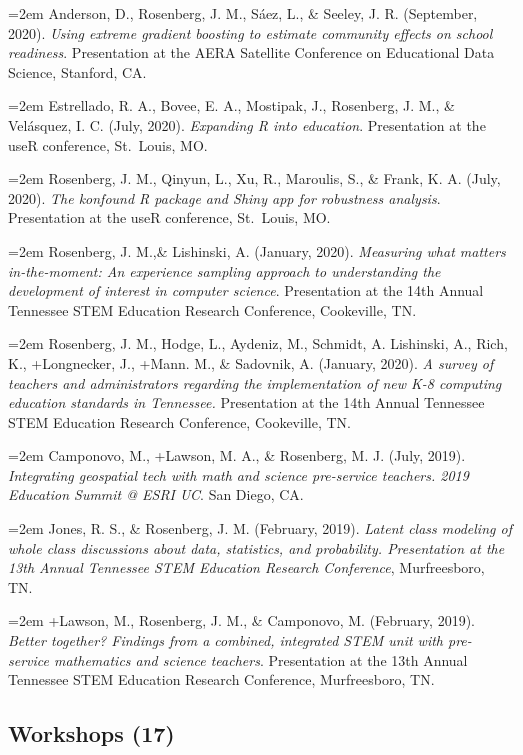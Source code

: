 \documentclass[
  14,
]{article}
\begin{document}
\hangindent=2em Anderson, D., Rosenberg, J. M., Sáez, L., \& Seeley, J.
R. (September, 2020). \emph{Using extreme gradient boosting to estimate
community effects on school readiness}. Presentation at the AERA
Satellite Conference on Educational Data Science, Stanford, CA.

\hangindent=2em Estrellado, R. A., Bovee, E. A., Mostipak, J.,
Rosenberg, J. M., \& Velásquez, I. C. (July, 2020). \emph{Expanding R
into education}. Presentation at the useR conference, St.~Louis, MO.

\hangindent=2em Rosenberg, J. M., Qinyun, L., Xu, R., Maroulis, S., \&
Frank, K. A. (July, 2020). \emph{The konfound R package and Shiny app
for robustness analysis}. Presentation at the useR conference,
St.~Louis, MO.

\hangindent=2em Rosenberg, J. M.,\& Lishinski, A. (January, 2020).
\emph{Measuring what matters in-the-moment: An experience sampling
approach to understanding the development of interest in computer
science}. Presentation at the 14th Annual Tennessee STEM Education
Research Conference, Cookeville, TN.

\hangindent=2em Rosenberg, J. M., Hodge, L., Aydeniz, M., Schmidt, A.
Lishinski, A., Rich, K., +Longnecker, J., +Mann. M., \& Sadovnik, A.
(January, 2020). \emph{A survey of teachers and administrators regarding
the implementation of new K-8 computing education standards in
Tennessee.} Presentation at the 14th Annual Tennessee STEM Education
Research Conference, Cookeville, TN.

\hangindent=2em Camponovo, M., +Lawson, M. A., \& Rosenberg, M. J.
(July, 2019). \emph{Integrating geospatial tech with math and science
pre-service teachers. 2019 Education Summit @ ESRI UC}. San Diego, CA.

\hangindent=2em Jones, R. S., \& Rosenberg, J. M. (February, 2019).
\emph{Latent class modeling of whole class discussions about data,
statistics, and probability. Presentation at the 13th Annual Tennessee
STEM Education Research Conference}, Murfreesboro, TN.

\hangindent=2em +Lawson, M., Rosenberg, J. M., \& Camponovo, M.
(February, 2019). \emph{Better together? Findings from a combined,
integrated STEM unit with pre-service mathematics and science teachers}.
Presentation at the 13th Annual Tennessee STEM Education Research
Conference, Murfreesboro, TN.

\hypertarget{workshops-17}{%
\subsection{Workshops (17)}\label{workshops-17}}
\end{document}
